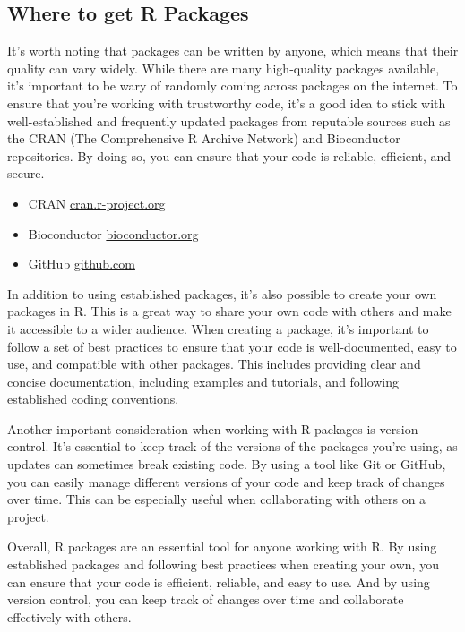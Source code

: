 \documentclass[
]{book}
\providecommand{\tightlist}{%
  \setlength{\itemsep}{0pt}\setlength{\parskip}{0pt}}
\begin{document}
\hypertarget{where-to-get-r-packages}{%
\subsection{Where to get R Packages}\label{where-to-get-r-packages}}

It's worth noting that packages can be written by anyone, which means that their quality can vary widely. While there are many high-quality packages available, it's important to be wary of randomly coming across packages on the internet. To ensure that you're working with trustworthy code, it's a good idea to stick with well-established and frequently updated packages from reputable sources such as the CRAN (The Comprehensive R Archive Network) and Bioconductor repositories. By doing so, you can ensure that your code is reliable, efficient, and secure.

\begin{itemize}
\tightlist
\item
  CRAN \href{https://cran.r-project.org/}{cran.r-project.org}
\item
  Bioconductor \href{https://bioconductor.org/}{bioconductor.org}
\item
  GitHub \href{https://github.com/}{github.com}
\end{itemize}

In addition to using established packages, it's also possible to create your own packages in R. This is a great way to share your own code with others and make it accessible to a wider audience. When creating a package, it's important to follow a set of best practices to ensure that your code is well-documented, easy to use, and compatible with other packages. This includes providing clear and concise documentation, including examples and tutorials, and following established coding conventions.

Another important consideration when working with R packages is version control. It's essential to keep track of the versions of the packages you're using, as updates can sometimes break existing code. By using a tool like Git or GitHub, you can easily manage different versions of your code and keep track of changes over time. This can be especially useful when collaborating with others on a project.

Overall, R packages are an essential tool for anyone working with R. By using established packages and following best practices when creating your own, you can ensure that your code is efficient, reliable, and easy to use. And by using version control, you can keep track of changes over time and collaborate effectively with others.
\end{document}
